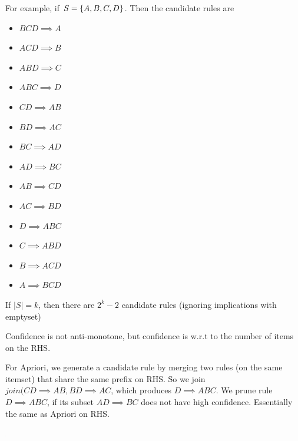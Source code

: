        For example, if $S = \{A, B, C, D\}$. Then the candidate rules are
        \begin{itemize}
            \item $BCD \implies A$
            \item $ACD \implies B$
            \item $ABD \implies C$
            \item $ABC \implies D$
            \item $CD \implies AB$
            \item $BD \implies AC$
            \item $BC \implies AD$
            \item $AD \implies BC$
            \item $AB \implies CD$
            \item $AC \implies BD$
            \item $D \implies ABC$
            \item $C \implies ABD$
            \item $B \implies ACD$
            \item $A \implies BCD$
        \end{itemize}
        
        If $|S| = k$, then there are $2^k - 2$ candidate rules (ignoring implications with emptyset)
        
        Confidence is not anti-monotone, but confidence is w.r.t to the number of items on the RHS. 
        
        For Apriori, we generate a candidate rule by merging two rules (on the same itemset) that share the same prefix on RHS. So we join $join(CD \implies AB, BD \implies AC$, which produces $D \implies ABC$. We prune rule $D \implies ABC$, if its subset $AD \implies BC$ does not have high confidence. Essentially the same as Apriori on RHS. 
        
        \begin{center}
            \includegraphics[width=1]{images/joining.png}
        \end{center}
    
